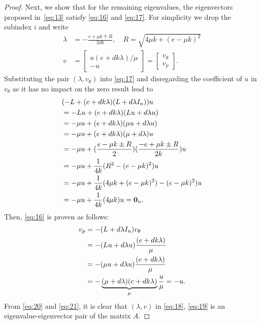 \documentclass[letter, 10pt, conference]{ieeeconf}
\newcommand{\1}{\mathbf{1}}
\newcommand{\0}{\mathbf{0}}
\begin{document}
{\begin{proof}
  Next, we show that for the remaining eigenvalues, the eigenvectors proposed
in~\eqref{eq:13} satisfy \eqref{eq:16} and \eqref{eq:17}.  For
  simplicity we drop the subindex $i$ and write
  \begin{align}
  	\label{eq:18}
  	\lambda&=-\frac{e+\mu k \mp R}{2dk},\quad
  	R=\sqrt{4\mu k + (e-\mu k)^2} \\
  	\label{eq:19}
  	v&=\begin{bmatrix}
  		 u (e+dk\lambda)/\mu  \\ -u
  	\end{bmatrix}=
  	\begin{bmatrix}
  		 v_\theta \\ v_p
  	\end{bmatrix}.
  \end{align}
  Substituting the pair $(\lambda,v_\theta)$ into \eqref{eq:17} and
  disregarding the coefficient of $u$ in $v_\theta$ as it has no
  impact on the zero result lead to
  \begin{align}
  	\notag &(-L+(e+dk\lambda)(L+d\lambda I_n)) u \\
  	\notag &=-L u + (e + dk \lambda) (Lu + d \lambda u) \\
  	\notag &=-\mu u + (e + dk \lambda) (\mu u + d \lambda u) \\
  	\notag &=-\mu u + (e + dk \lambda) (\mu + d \lambda) u \\
  	\notag &=-\mu u + (\frac{e-\mu k \pm R}{2})
  			    (\frac{-e+\mu k \pm R}{2k}) u \\
\notag &=-\mu u + \frac{1}{4k} ( R^2 - (e-\mu k)^2) u \\
  	\notag &=-\mu u + \frac{1}{4k} ( 4 \mu k + (e-\mu k)^2) - (e-\mu k)^2) u \\
  	 &=-\mu u + \frac{1}{4k} ( 4 \mu k) u = \0_n.
  	\label{eq:20}
\end{align}
  Then, \eqref{eq:16} is proven as follows:
  \begin{align}
    \notag v_p &= -(L+d \lambda I_n)v_\theta
    \\\notag &= -(Lu + d \lambda u) \frac{(e+dk\lambda)}{\mu} \\
    \notag &= -(\mu u + d \lambda u) \frac{(e+dk\lambda)}{\mu} \\
  	\label{eq:21} 
  	&= -\underbrace{(\mu + d \lambda) (e+dk\lambda)}_{\mu} \frac{u}{\mu}
  	= -u.
  \end{align}
  From \eqref{eq:20} and \eqref{eq:21}, it is clear that $(\lambda,v)$
  in \eqref{eq:18}, \eqref{eq:19} is an eigenvalue-eigenvector pair of
  the matrix $A$.
\end{proof}


}
\end{document}
